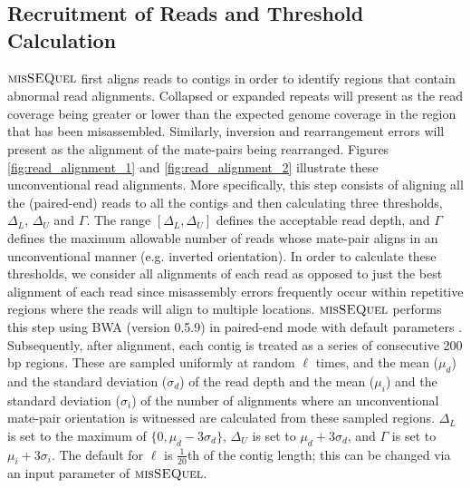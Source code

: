 \subsection{Recruitment of Reads and Threshold Calculation}  

$\mbox{\rm {\sc misSEQuel}}$ first aligns reads to contigs in order to identify regions that contain abnormal read alignments.  
Collapsed or expanded repeats will present as the read coverage being greater or lower than the expected genome coverage in the region that has been misassembled.  Similarly, inversion and rearrangement errors will present as the alignment of the mate-pairs being rearranged. Figures \ref{fig:read_alignment_1} and \ref{fig:read_alignment_2} illustrate these unconventional read alignments. More specifically, this step consists of aligning all the (paired-end) reads to all the contigs and then calculating three thresholds, $\Delta_L$, $\Delta_U$ and $\Gamma$.  The range $[\Delta_L, \Delta_U]$ defines the acceptable read depth, and $\Gamma$ defines the maximum allowable number of reads whose mate-pair aligns in an unconventional manner (e.g. inverted orientation). 
In order to calculate these thresholds, we consider all alignments of each read as opposed to just the best alignment of each read since misassembly errors frequently occur within repetitive regions where the reads will align to multiple locations.  
$\mbox{\rm {\sc misSEQuel}}$ performs this step using BWA (version 0.5.9) in paired-end mode with default parameters \cite{bwa}. %
  Subsequently, after alignment, each contig is treated as a series of consecutive 200 bp regions.  These are sampled uniformly at random $\ell$ times, and the mean ($\mu_{d}$) and the standard deviation ($\sigma_d$) of the read depth and the mean ($\mu_{i}$) and the standard deviation ($\sigma_i$) of the number of alignments where an unconventional mate-pair orientation is witnessed are calculated from these sampled regions.   $\Delta_L$ is set to the maximum of $\{0, \mu_d - 3\sigma_d\}$, $\Delta_U$ is set to $\mu_d + 3\sigma_d$, and $\Gamma$ is set to $\mu_i + 3\sigma_i$.  The default for $\ell$ is $\frac{1}{20}$th of the contig length; this can be changed via an input parameter of $\mbox{\rm {\sc misSEQuel}}$.  



